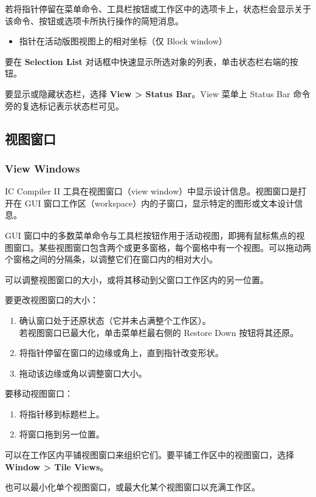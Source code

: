 若将指针停留在菜单命令、工具栏按钮或工作区中的选项卡上，状态栏会显示关于该命令、按钮或选项卡所执行操作的简短消息。
\begin{itemize}
  \item 指针在活动版图视图上的相对坐标（仅 Block window）
\end{itemize}

要在 \textbf{Selection List} 对话框中快速显示所选对象的列表，单击状态栏右端的按钮。

要显示或隐藏状态栏，选择 \textbf{View > Status Bar}。View 菜单上 Status Bar 命令旁的复选标记表示状态栏可见。

\subsection{视图窗口}
\subsubsection*{View Windows}

IC Compiler II 工具在视图窗口（view window）中显示设计信息。视图窗口是打开在 GUI 窗口工作区（workspace）内的子窗口，显示特定的图形或文本设计信息。

GUI 窗口中的多数菜单命令与工具栏按钮作用于活动视图，即拥有鼠标焦点的视图窗口。某些视图窗口包含两个或更多窗格，每个窗格中有一个视图。可以拖动两个窗格之间的分隔条，以调整它们在窗口内的相对大小。

可以调整视图窗口的大小，或将其移动到父窗口工作区内的另一位置。

要更改视图窗口的大小：
\begin{enumerate}
  \item 确认窗口处于还原状态（它并未占满整个工作区）。\\
        若视图窗口已最大化，单击菜单栏最右侧的 Restore Down 按钮将其还原。
  \item 将指针停留在窗口的边缘或角上，直到指针改变形状。
  \item 拖动该边缘或角以调整窗口大小。
\end{enumerate}

要移动视图窗口：
\begin{enumerate}
  \item 将指针移到标题栏上。
  \item 将窗口拖到另一位置。
\end{enumerate}

可以在工作区内平铺视图窗口来组织它们。要平铺工作区中的视图窗口，选择 \textbf{Window > Tile Views}。

也可以最小化单个视图窗口，或最大化某个视图窗口以充满工作区。

